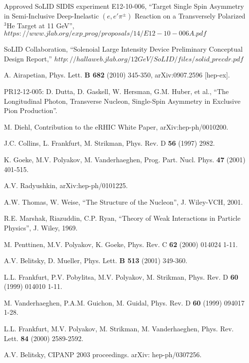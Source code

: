\clearpage
\begin{thebibliography}{}

  Approved SoLID SIDIS experiment E12-10-006,
  ``Target Single Spin Asymmetry in Semi-Inclusive Deep-Inelastic
  $(e,e'\pi^{\pm})$ Reaction on a Transversely Polarized $\mathrm{^{3}He}$
  Target at 11 GeV'',
$https://www.jlab.org/exp\_prog/proposals/14/E12-10-006A.pdf$

  SoLID Collaboration, ``Solenoial Large Intensity Device Preliminary
  Conceptual Design Report,''
  $http://hallaweb.jlab.org/12GeV/SoLID/files/solid\_precdr.pdf$
  
 A. Airapetian, Phys. Lett. {\bf B 682} (2010) 345-350,
  arXiv:0907.2596 [hep-ex].

 PR12-12-005:
D. Dutta, D. Gaskell, W. Hersman, G.M. Huber, et al., ``The Longitudinal
Photon, Transverse Nucleon, Single-Spin Asymmetry in Exclusive Pion
Production''.

 M. Diehl, Contribution to the eRHIC White Paper,
arXiv:hep-ph/0010200.

 J.C. Collins, L. Frankfurt, M. Strikman, Phys. Rev. D {\bf 56}
  (1997) 2982.

 K. Goeke, M.V. Polyakov, M. Vanderhaeghen,
  Prog. Part. Nucl. Phys. {\bf 47} (2001) 401-515.

 A.V. Radyushkin, arXiv:hep-ph/0101225.

 A.W. Thomas, W. Weise, ``The Structure of the Nucleon'',
  J. Wiley-VCH, 2001.

 R.E. Marshak, Riazuddin, C.P. Ryan, ``Theory of Weak
  Interactions in Particle Physics'', J. Wiley, 1969.

 M. Penttinen, M.V. Polyakov, K. Goeke, Phys. Rev. C {\bf 62}
  (2000) 014024 1-11.

 A.V. Belitsky, D. Mueller, Phys. Lett. {\bf B 513}
  (2001) 349-360.

 L.L. Frankfurt, P.V. Pobylitsa, M.V. Polyakov, M. Strikman,
  Phys. Rev. D {\bf 60} (1999) 014010 1-11.

 M. Vanderhaeghen, P.A.M. Guichon, M. Guidal, Phys. Rev. D 
  {\bf 60} (1999) 094017 1-28.

 L.L. Frankfurt, M.V. Polyakov, M. Strikman, M. Vanderhaeghen,
  Phys. Rev. Lett. {\bf 84} (2000) 2589-2592.

 A.V. Belitsky, CIPANP 2003 proceedings.  arXiv:
  hep-ph/0307256.


\end{thebibliography}
